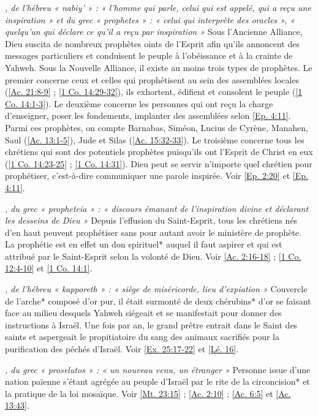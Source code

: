 \begin{multicols}{2}
\textit{, de l'hébreu « nabiy' » : « l'homme qui parle, celui qui est appelé, qui a reçu une inspiration » et du grec « prophetes » : « celui qui interprète des oracles », « quelqu'un qui déclare ce qu'il a reçu par inspiration »}\newline
Sous l'Ancienne Alliance, Dieu suscita de nombreux prophètes oints de l'Esprit afin qu'ils annoncent des messages particuliers et conduisent le peuple à l'obéissance et à la crainte de Yahweh. Sous la Nouvelle Alliance, il existe au moins trois types de prophètes. Le premier concerne ceux et celles qui prophétisent au sein des assemblées locales (\vref{Ac. 21:8-9} ; \vref{1 Co. 14:29-32}), ils exhortent, édifient et consolent le peuple (\vref{1 Co. 14:1-3}). Le deuxième concerne les personnes qui ont reçu la charge d'enseigner, poser les fondements, implanter des assemblées selon \vref{Ep. 4:11}. Parmi ces prophètes, on compte Barnabas, Siméon, Lucius de Cyrène, Manahen, Saul (\vref{Ac. 13:1-5}), Jude et Silas (\vref{Ac. 15:32-33}). Le troisième concerne tous les chrétiens qui sont des potentiels prophètes puisqu'ils ont l'Esprit de Christ en eux (\vref{1 Co. 14:23-25} ; \vref{1 Co. 14:31}). Dieu peut se servir n'importe quel chrétien pour prophétiser, c'est-à-dire communiquer une parole inspirée. Voir \vref{Ep. 2:20} et \vref{Ep. 4:11}.

\textit{, du grec « propheteia » : « discours émanant de l'inspiration divine et déclarant les desseins de Dieu »}\newline
Depuis l'effusion du Saint-Esprit, tous les chrétiens nés d'en haut peuvent prophétiser sans pour autant avoir le ministère de prophète. La prophétie est en effet un don spirituel* auquel il faut aspirer et qui est attribué par le Saint-Esprit selon la volonté de Dieu. Voir \vref{Ac. 2:16-18} ; \vref{1 Co. 12:4-10} et \vref{1 Co. 14:1}.

\textit{, de l'hébreu « kapporeth » : « siège de miséricorde, lieu d'expiation »}\newline
Couvercle de l'arche* composé d'or pur, il était surmonté de deux chérubins* d'or se faisant face au milieu desquels Yahweh siégeait et se manifestait pour donner des instructions à Israël. Une fois par an, le grand prêtre entrait dans le Saint des saints et aspergeait le propitiatoire du sang des animaux sacrifiés pour la purification des péchés d'Israël. Voir \vref{Ex. 25:17-22} et \vref{Lé. 16}.

\textit{, du grec « proselutos » : « un nouveau venu, un étranger »}\newline
Personne issue d'une nation païenne s'étant agrégée au peuple d'Israël par le rite de la circoncision* et la pratique de la loi mosaïque. Voir \vref{Mt. 23:15} ; \vref{Ac. 2:10} ; \vref{Ac. 6:5} et \vref{Ac. 13:43}.


\end{multicols}
